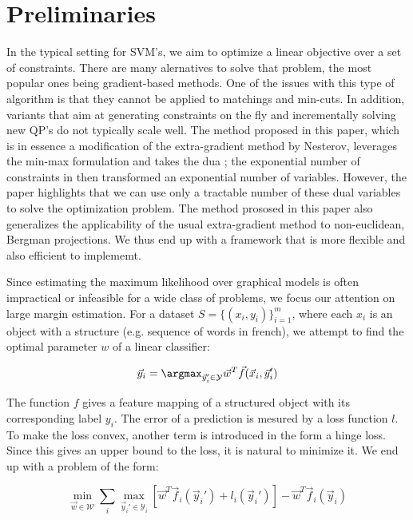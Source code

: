 \section{Preliminaries}

In the typical setting for SVM's, we aim to optimize a linear objective over a
set of constraints. There are many alernatives to solve that problem, the most
popular ones being gradient-based methods. One of the issues with this type of
algorithm is that they cannot be applied to matchings and min-cuts. In addition,
variants that aim at generating constraints on the fly and incrementally solving
new QP's do not typically scale well. The method proposed in this paper, which
is in essence a modification of the extra-gradient method by Nesterov, leverages
the min-max formulation and takes the dua ; the exponential number of
constraints in then transformed an exponential number of variables. However, the
paper highlights that we can use only a tractable number of these dual variables
to solve the optimization problem. The method prososed in this paper also
generalizes the applicability of the usual extra-gradient method to
non-euclidean, Bergman projections. We thus end up with a framework that is more
flexible and also efficient to implememt.

Since estimating the maximum likelihood over graphical models is often
impractical or infeasible for a wide class of problems, we focus our attention
on large margin estimation. For a dataset $ S = \{ (x_i, y_i) \}_{i=1}^{m} $,
where each $x_i$ is an object with a structure (e.g. sequence of words in
french), we attempt to find the optimal parameter $w$ of a linear classifier:

\begin{equation}
  \vec y_i = \argmax_{\vec y_i' \in \mathcal{Y}} \vec w^T \vec f(\vec x_i,\vec y_i')
  \label{eq1}
\end{equation}

The function $f$ gives a feature mapping of a structured object with its
corresponding label $y_i$. The error of a prediction is mesured by a loss
function $l$. To make the loss convex, another term is introduced in the form a
hinge loss. Since this gives an upper bound to the loss, it is natural to
minimize it. We end up with a problem of the form:

\begin{equation}
  \min_{\vec w \in \mathcal{W}} \sum_i \max_{\vec y_i' \in \mathcal{Y}_i} \left[
\vec w^T \vec f_i(\vec y_i') + l_i(\vec y_i') \right] - \vec w^T \vec f_i(\vec
y_i)
\end{equation}

